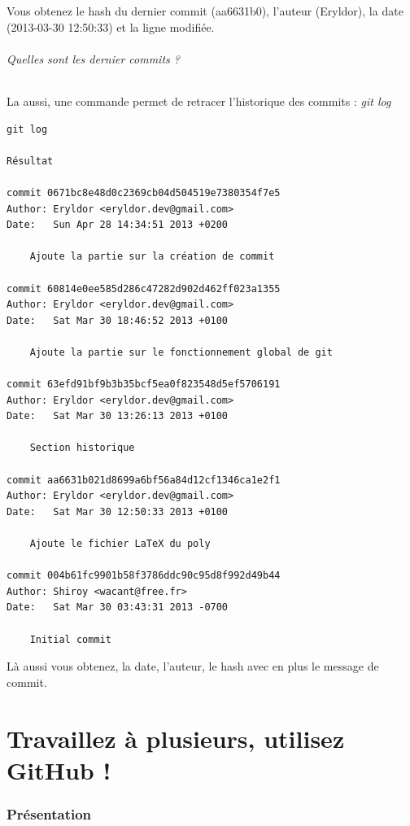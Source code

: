 \documentclass[a4paper]{article}
\begin{document}
Vous obtenez le hash du dernier commit (aa6631b0), l'auteur (Eryldor), la date (2013-03-30 12:50:33) et la ligne modifiée.

\paragraph{Quelles sont les dernier commits ?}

La aussi, une commande permet de retracer l'historique des commits : \emph{git log}

\begin{verbatim}
git log

Résultat

commit 0671bc8e48d0c2369cb04d504519e7380354f7e5
Author: Eryldor <eryldor.dev@gmail.com>
Date:   Sun Apr 28 14:34:51 2013 +0200

    Ajoute la partie sur la création de commit

commit 60814e0ee585d286c47282d902d462ff023a1355
Author: Eryldor <eryldor.dev@gmail.com>
Date:   Sat Mar 30 18:46:52 2013 +0100

    Ajoute la partie sur le fonctionnement global de git

commit 63efd91bf9b3b35bcf5ea0f823548d5ef5706191
Author: Eryldor <eryldor.dev@gmail.com>
Date:   Sat Mar 30 13:26:13 2013 +0100

    Section historique

commit aa6631b021d8699a6bf56a84d12cf1346ca1e2f1
Author: Eryldor <eryldor.dev@gmail.com>
Date:   Sat Mar 30 12:50:33 2013 +0100

    Ajoute le fichier LaTeX du poly

commit 004b61fc9901b58f3786ddc90c95d8f992d49b44
Author: Shiroy <wacant@free.fr>
Date:   Sat Mar 30 03:43:31 2013 -0700

    Initial commit
\end{verbatim}

Là aussi vous obtenez, la date, l'auteur, le hash avec en plus le message de commit.

\part{Travaillez à plusieurs, utilisez GitHub !}

\section{Présentation}
\end{document}
